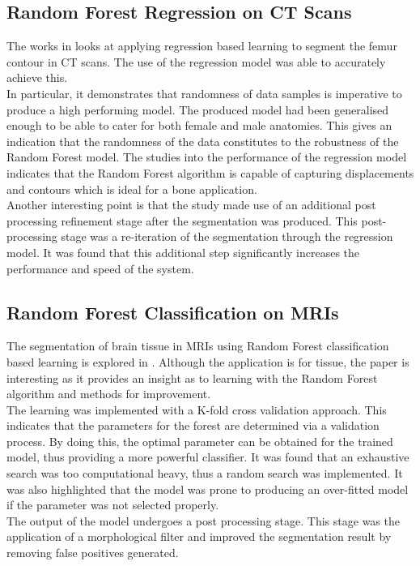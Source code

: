 \subsection{Random Forest Regression on CT Scans}
The works in \cite{ref:ct2013} looks at applying regression based learning to segment the femur contour in CT scans. The use of the regression model was able to accurately achieve this. 
\\[1\baselineskip]
In particular, it demonstrates that randomness of data samples is imperative to produce a high performing model. The produced model had been generalised enough to be able to cater for both female and male anatomies. This gives an indication that the randomness of the data constitutes to the robustness of the Random Forest model. The studies into the performance of the regression model indicates that the Random Forest algorithm is capable of capturing displacements and contours which is ideal for a bone application. 
\\[1\baselineskip] 
Another interesting point is that the study made use of an additional post processing refinement stage after the segmentation was produced. This post-processing stage was a re-iteration of the segmentation through the regression model. It was found that this additional step significantly increases the performance and speed of the system. 

\subsection{Random Forest Classification on MRIs}
The segmentation of brain tissue in MRIs using Random Forest classification based learning  is explored in \cite{ref:pinto}. Although the application is for tissue, the paper is interesting as it provides an insight as to learning with the Random Forest algorithm and methods for improvement. 
\\[1\baselineskip]
The learning was implemented with a K-fold cross validation approach. This indicates that the parameters for the forest are determined via a validation process. By doing this, the optimal parameter can be obtained for the trained model, thus providing a more powerful classifier. It was found that an exhaustive search was too computational heavy, thus a random search was implemented. It was also highlighted that the model was prone to producing an over-fitted model if the parameter was not selected properly. 
\\[1\baselineskip]
The output of the model undergoes a post processing stage. This stage was the application of a morphological filter and improved the segmentation result by removing false positives generated. 

